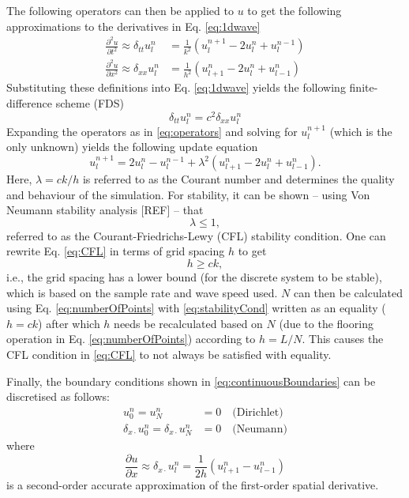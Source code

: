 \documentclass[preprint]{JASA}
\begin{document}
The following operators can then be applied to $u$ to get the following approximations to the derivatives in Eq. \eqref{eq:1dwave}
\begin{subequations}\label{eq:operators}
    \begin{align}
         \frac{\partial^2u}{\partial t^2} \approx \delta_{tt}u_l^n &= \frac{1}{k^2}\left(u_l^{n+1}-2u_l^n + u_l^{n-1}\right)\label{eq:secondOrderTime}\\
         \frac{\partial^2u}{\partial x^2} \approx \delta_{xx}u_l^n &= \frac{1}{h^2}\left(u_{l+1}^n-2u_l^n + u_{l-1}^n\right)\label{eq:secondOrderSpace}
    \end{align}
\end{subequations}
Substituting these definitions into Eq. \eqref{eq:1dwave} yields the following finite-difference scheme (FDS)
\begin{equation}
    \delta_{tt}u_l^n = c^2 \delta_{xx}u_l^n
\end{equation}
Expanding the operators as in %
\eqref{eq:operators} and solving for $u_l^{n+1}$ (which is the only unknown) yields the following update equation
\begin{equation}\label{eq:updateEq}
    u_l^{n+1} = 2u_l^n-u_l^{n-1} + \lambda^2 \left(u_{l+1}^n-2u_l^n + u_{l-1}^n\right).
\end{equation}
Here, $\lambda = ck/h$ is referred to as the Courant number and determines the quality and behaviour of the simulation. For stability, it can be shown -- using Von Neumann stability analysis [REF] -- that \begin{equation}\label{eq:CFL}
    \lambda \leq 1,
\end{equation}
referred to as the Courant-Friedrichs-Lewy (CFL) stability condition. One can rewrite Eq. \eqref{eq:CFL} in terms of grid spacing $h$ to get
\begin{equation}\label{eq:stabilityCond}
    h \geq ck,
\end{equation}
i.e., the grid spacing has a lower bound (for the discrete system to be stable), which is based on the sample rate and wave speed used. $N$ can then be calculated using Eq. \eqref{eq:numberOfPoints} with \eqref{eq:stabilityCond} written as an equality ($h = ck$) after which $h$ needs be recalculated based on $N$ (due to the flooring operation in Eq. \eqref{eq:numberOfPoints}) according to $h = L/N$. This causes the CFL condition in \eqref{eq:CFL} to not always be satisfied with equality.

Finally, the boundary conditions shown in \eqref{eq:continuousBoundaries} can be discretised as follows:
\begin{align}
    u_0^n = u_N^n &= 0 \quad\text{(Dirichlet)}\\
    \delta_{x\cdot} u_0^n = \delta_{x\cdot} u_N^n &= 0 \quad \text{(Neumann)}
\end{align}
where 
\begin{equation}
    \frac{\partial u}{\partial x} \approx \delta_{x\cdot}u_l^n = \frac{1}{2h}\left(u_{l+1}^n - u_{l-1}^n\right)
\end{equation}
is a second-order accurate approximation of the first-order spatial derivative.
\end{document}
